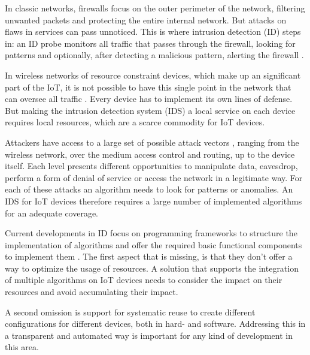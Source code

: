 \documentclass[conference]{IEEEtran}
\begin{document}

In classic networks, firewalls focus on the outer perimeter of the network,
filtering unwanted packets and protecting the entire internal network. But
attacks on flaws in services can pass unnoticed. This is where intrusion
detection (ID) steps in: an ID probe monitors all traffic that passes through
the firewall, looking for patterns and optionally, after detecting a malicious
pattern, alerting the firewall \cite{denning1987intrusion}.


In wireless networks of resource constraint devices, which make up an
significant part of the IoT, it is not possible to have this single point in
the network that can oversee all traffic \cite{mishra2004intrusion}. Every
device has to implement its own lines of defense. But making the intrusion
detection system (IDS) a local service on each device requires local resources,
which are a scarce commodity for IoT devices.

Attackers have access to a large set of possible attack vectors
\cite{aschenbruck2012security}, ranging from the wireless network, over the
medium access control and routing, up to the device itself. Each level presents
different opportunities to manipulate data, eavesdrop, perform a form of denial
of service or access the network in a legitimate way. For each of these attacks
an algorithm needs to look for patterns or anomalies. An IDS for IoT devices
therefore requires a large number of implemented algorithms for an adequate
coverage.


Current developments in ID focus on programming frameworks to structure the
implementation of algorithms \cite{valero2012di} and offer the required basic
functional components to implement them \cite{krontiris2008lidea}. The first
aspect that is missing, is that they don't offer a way to optimize the usage of
resources. A solution that supports the integration of multiple algorithms on
IoT devices needs to consider the impact on their resources and avoid
accumulating their impact.

A second omission is support for systematic reuse to create different
configurations for different devices, both in hard- and software. Addressing
this in a transparent and automated way is important for any kind of
development in this area.

\end{document}
